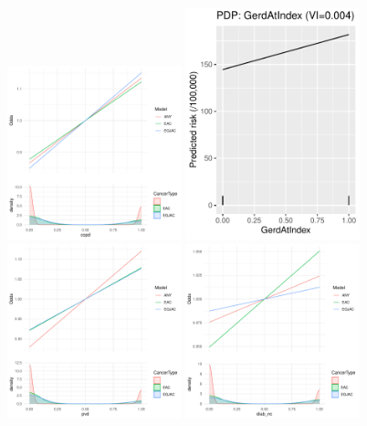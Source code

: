 \documentclass[12pt]{article}
\begin{document}
\clearpage
\begin{figure}[h]
\centering
\includegraphics[width=0.45\textwidth]{figures/pdp/copd.pdf}
\includegraphics[width=0.45\textwidth]{figures/pdp/GerdAtIndex.pdf}
\includegraphics[width=0.45\textwidth]{figures/pdp/pvd.pdf}
\includegraphics[width=0.45\textwidth]{figures/pdp/diab_nc.pdf}
\end{figure}
\end{document}
